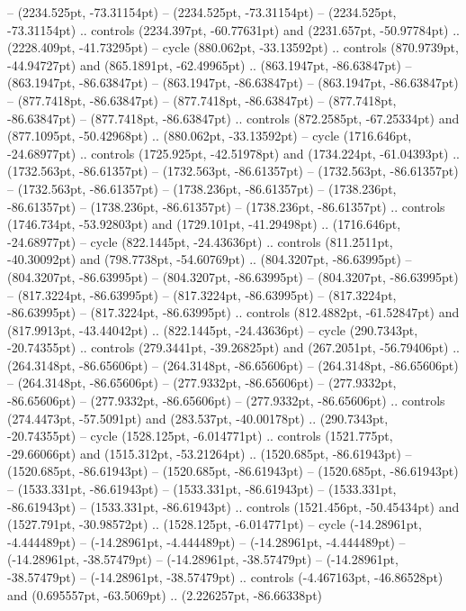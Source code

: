  -- (2234.525pt, -73.31154pt)
 -- (2234.525pt, -73.31154pt)
 -- (2234.525pt, -73.31154pt) .. controls (2234.397pt, -60.77631pt) and (2231.657pt, -50.97784pt) .. (2228.409pt, -41.73295pt) -- cycle
(880.062pt, -33.13592pt) .. controls (870.9739pt, -44.94727pt) and (865.1891pt, -62.49965pt) .. (863.1947pt, -86.63847pt)
 -- (863.1947pt, -86.63847pt)
 -- (863.1947pt, -86.63847pt)
 -- (863.1947pt, -86.63847pt)
 -- (877.7418pt, -86.63847pt)
 -- (877.7418pt, -86.63847pt)
 -- (877.7418pt, -86.63847pt)
 -- (877.7418pt, -86.63847pt) .. controls (872.2585pt, -67.25334pt) and (877.1095pt, -50.42968pt) .. (880.062pt, -33.13592pt) -- cycle
(1716.646pt, -24.68977pt) .. controls (1725.925pt, -42.51978pt) and (1734.224pt, -61.04393pt) .. (1732.563pt, -86.61357pt)
 -- (1732.563pt, -86.61357pt)
 -- (1732.563pt, -86.61357pt)
 -- (1732.563pt, -86.61357pt)
 -- (1738.236pt, -86.61357pt)
 -- (1738.236pt, -86.61357pt)
 -- (1738.236pt, -86.61357pt)
 -- (1738.236pt, -86.61357pt) .. controls (1746.734pt, -53.92803pt) and (1729.101pt, -41.29498pt) .. (1716.646pt, -24.68977pt) -- cycle
(822.1445pt, -24.43636pt) .. controls (811.2511pt, -40.30092pt) and (798.7738pt, -54.60769pt) .. (804.3207pt, -86.63995pt)
 -- (804.3207pt, -86.63995pt)
 -- (804.3207pt, -86.63995pt)
 -- (804.3207pt, -86.63995pt)
 -- (817.3224pt, -86.63995pt)
 -- (817.3224pt, -86.63995pt)
 -- (817.3224pt, -86.63995pt)
 -- (817.3224pt, -86.63995pt) .. controls (812.4882pt, -61.52847pt) and (817.9913pt, -43.44042pt) .. (822.1445pt, -24.43636pt) -- cycle
(290.7343pt, -20.74355pt) .. controls (279.3441pt, -39.26825pt) and (267.2051pt, -56.79406pt) .. (264.3148pt, -86.65606pt)
 -- (264.3148pt, -86.65606pt)
 -- (264.3148pt, -86.65606pt)
 -- (264.3148pt, -86.65606pt)
 -- (277.9332pt, -86.65606pt)
 -- (277.9332pt, -86.65606pt)
 -- (277.9332pt, -86.65606pt)
 -- (277.9332pt, -86.65606pt) .. controls (274.4473pt, -57.5091pt) and (283.537pt, -40.00178pt) .. (290.7343pt, -20.74355pt) -- cycle
(1528.125pt, -6.014771pt) .. controls (1521.775pt, -29.66066pt) and (1515.312pt, -53.21264pt) .. (1520.685pt, -86.61943pt)
 -- (1520.685pt, -86.61943pt)
 -- (1520.685pt, -86.61943pt)
 -- (1520.685pt, -86.61943pt)
 -- (1533.331pt, -86.61943pt)
 -- (1533.331pt, -86.61943pt)
 -- (1533.331pt, -86.61943pt)
 -- (1533.331pt, -86.61943pt) .. controls (1521.456pt, -50.45434pt) and (1527.791pt, -30.98572pt) .. (1528.125pt, -6.014771pt) -- cycle
(-14.28961pt, -4.444489pt) -- (-14.28961pt, -4.444489pt)
 -- (-14.28961pt, -4.444489pt)
 -- (-14.28961pt, -38.57479pt)
 -- (-14.28961pt, -38.57479pt)
 -- (-14.28961pt, -38.57479pt)
 -- (-14.28961pt, -38.57479pt) .. controls (-4.467163pt, -46.86528pt) and (0.695557pt, -63.5069pt) .. (2.226257pt, -86.66338pt)
